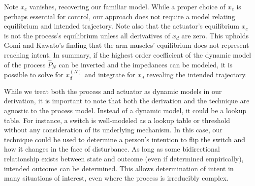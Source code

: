 Note $x_e$ vanishes, recovering our familiar model. While a proper choice of $x_e$ is perhaps essential for control, our approach does not require a model relating equilibrium and intended trajectory. Note also that the actuator's equilibrium $x_e$ is not the process's equilibrium unless all derivatives of $x_d$ are zero. This upholds Gomi and Kawato's finding that the arm muscles' equilibrium does not represent reaching intent\cite{gomi1997human}. In summary, if the highest order coefficient of the dynamic model of the process $\hat{P}_N$ can be inverted and the impedances can be modeled, it is possible to solve for $x_d^{(N)}$ and integrate for $x_d$ revealing the intended trajectory.

While we treat both the process and actuator as dynamic models in our derivation, it is important to note that both the derivation and the technique are agnostic to the process model. Instead of a dynamic model, it could be a lookup table. For instance, a switch is well-modeled as a lookup table or threshold without any consideration of its underlying mechanism. In this case, our technique could be used to determine a person's intention to flip the switch and how it changes in the face of disturbance. As long as some bidirectional relationship  exists between state and outcome (even if determined empirically), intended outcome can be determined. This allows determination of intent in many situations of interest, even where the process is irreducibly complex.

